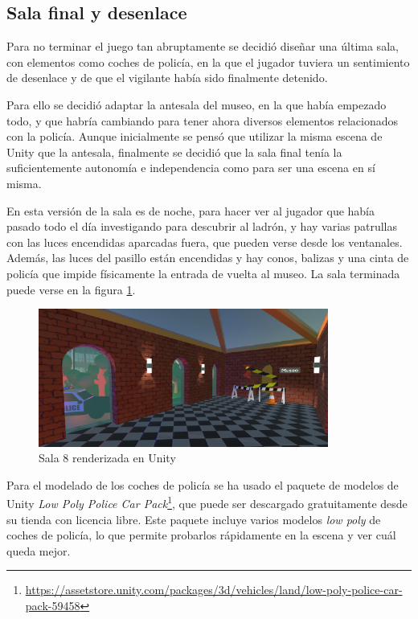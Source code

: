 \subsection{Sala final y desenlace}

Para no terminar el juego tan abruptamente se decidió diseñar una última sala, con elementos como coches de policía, en la que el jugador tuviera un sentimiento de desenlace y de que el vigilante había sido finalmente detenido.

Para ello se decidió adaptar la antesala del museo, en la que había empezado todo, y que habría cambiando para tener ahora diversos elementos relacionados con la policía. Aunque inicialmente se pensó que utilizar la misma escena de Unity que la antesala, finalmente se decidió que la sala final tenía la suficientemente autonomía e independencia como para ser una escena en sí misma.

En esta versión de la sala es de noche, para hacer ver al jugador que había pasado todo el día investigando para descubrir al ladrón, y hay varias patrullas con las luces encendidas aparcadas fuera, que pueden verse desde los ventanales. Además, las luces del pasillo están encendidas y hay conos, balizas y una cinta de policía que impide físicamente la entrada de vuelta al museo. La sala terminada puede verse en la figura \ref{fig:unity-sala-8}.

\begin{figure}[!h]
\begin{center}
\includegraphics[width=0.85\textwidth]{imagenes/7/salas-unity/unity-sala-8.png}
\caption{Sala 8 renderizada en Unity}
\label{fig:unity-sala-8}
\end{center}
\end{figure}

Para el modelado de los coches de policía se ha usado el paquete de modelos de Unity \textit{Low Poly Police Car Pack}\footnote{\url{https://assetstore.unity.com/packages/3d/vehicles/land/low-poly-police-car-pack-59458}}, que puede ser descargado gratuitamente desde su tienda con licencia libre. Este paquete incluye varios modelos \textit{low poly} de coches de policía, lo que permite probarlos rápidamente en la escena y ver cuál queda mejor.

